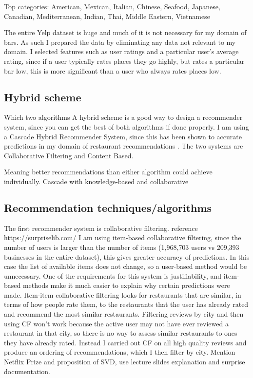 \documentclass[conference]{IEEEtran}
\begin{document}
Top categories: American, Mexican, Italian, Chinese, Seafood, Japanese, Canadian, Mediterranean, Indian, Thai, Middle Eastern, Vietnamese

The entire Yelp dataset is huge and much of it is not necessary for my domain of bars.
As such I prepared the data by eliminating any data not relevant to my domain.
I selected features such as user ratings and a particular user's average rating,
since if a user typically rates places they go highly, but rates a particular bar low,
this is more significant than a user who always rates places low.

\subsection{Hybrid scheme}
Which two algorithms
A hybrid scheme is a good way to design a recommender system, since you can get the
best of both algorithms if done properly. 
I am using a Cascade Hybrid Recommender System, since this has been shown to accurate predictions 
in my domain of restaurant recommendations \cite{burke2007hybrid}. 
The two systems are Collaborative Filtering and Content Based. 

Meaning better recommendations than either algorithm could achieve individually.
Cascade with knowledge-based and collaborative


\subsection{Recommendation techniques/algorithms}
The first recommender system is collaborative filtering. reference https://surpriselib.com/
I am using item-based collaborative filtering, since the number of users is larger than the number of items 
(1,968,703 users vs 209,393 businesses in the entire dataset), this gives greater accuracy of predictions. 
In this case the list of available items does not change, so a user-based method would be unnecessary. 
One of the requirements for this system is justifiability, and item-based methods make it much easier to 
explain why certain predictions were made. 
Item-item collaborative filtering looks for restaurants that are similar, in terms of how people rate them, 
to the restaurants that the user has already rated and recommend the most similar restaurants. 
Filtering reviews by city and then using CF won't work because the active user may not have ever reviewed a restaurant 
in that city, so there is no way to assess similar restaurants to ones they have already rated. 
Instead I carried out CF on all high quality reviews and produce an ordering of recommendations, which I then filter 
by city. 
Mention Netflix Prize and proposition of SVD, use lecture slides explanation and surprise documentation. 
\end{document}
